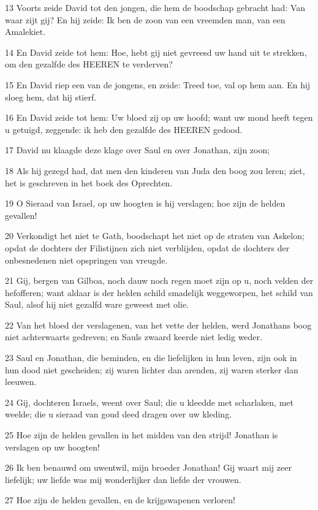 \par 13 Voorts zeide David tot den jongen, die hem de boodschap gebracht had: Van waar zijt gij? En hij zeide: Ik ben de zoon van een vreemden man, van een Amalekiet.
\par 14 En David zeide tot hem: Hoe, hebt gij niet gevreesd uw hand uit te strekken, om den gezalfde des HEEREN te verderven?
\par 15 En David riep een van de jongens, en zeide: Treed toe, val op hem aan. En hij sloeg hem, dat hij stierf.
\par 16 En David zeide tot hem: Uw bloed zij op uw hoofd; want uw mond heeft tegen u getuigd, zeggende: ik heb den gezalfde des HEEREN gedood.
\par 17 David nu klaagde deze klage over Saul en over Jonathan, zijn zoon;
\par 18 Als hij gezegd had, dat men den kinderen van Juda den boog zou leren; ziet, het is geschreven in het boek des Oprechten.
\par 19 O Sieraad van Israel, op uw hoogten is hij verslagen; hoe zijn de helden gevallen!
\par 20 Verkondigt het niet te Gath, boodschapt het niet op de straten van Askelon; opdat de dochters der Filistijnen zich niet verblijden, opdat de dochters der onbesnedenen niet opspringen van vreugde.
\par 21 Gij, bergen van Gilboa, noch dauw noch regen moet zijn op u, noch velden der hefofferen; want aldaar is der helden schild smadelijk weggeworpen, het schild van Saul, alsof hij niet gezalfd ware geweest met olie.
\par 22 Van het bloed der verslagenen, van het vette der helden, werd Jonathans boog niet achterwaarts gedreven; en Sauls zwaard keerde niet ledig weder.
\par 23 Saul en Jonathan, die beminden, en die liefelijken in hun leven, zijn ook in hun dood niet gescheiden; zij waren lichter dan arenden, zij waren sterker dan leeuwen.
\par 24 Gij, dochteren Israels, weent over Saul; die u kleedde met scharlaken, met weelde; die u sieraad van goud deed dragen over uw kleding.
\par 25 Hoe zijn de helden gevallen in het midden van den strijd! Jonathan is verslagen op uw hoogten!
\par 26 Ik ben benauwd om uwentwil, mijn broeder Jonathan! Gij waart mij zeer liefelijk; uw liefde was mij wonderlijker dan liefde der vrouwen.
\par 27 Hoe zijn de helden gevallen, en de krijgswapenen verloren!

